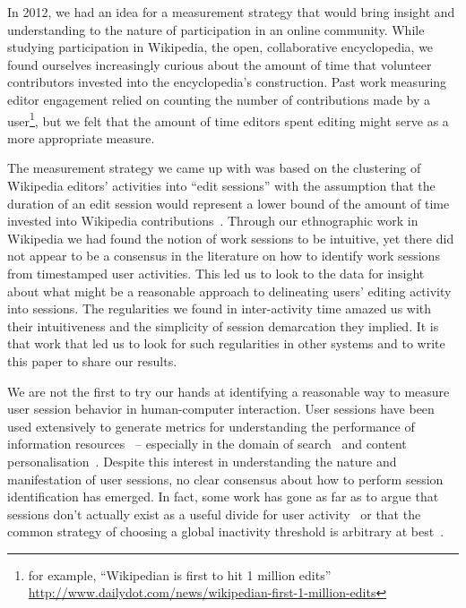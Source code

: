 In 2012, we had an idea for a measurement strategy that would bring insight and understanding to the nature of participation in an online community.  While studying participation in Wikipedia, the open, collaborative encyclopedia, we found ourselves increasingly curious about the amount of time that volunteer contributors invested into the encyclopedia's construction.  Past work measuring editor engagement relied on counting the number of contributions made by a user\footnote{for example, ``Wikipedian is first to hit 1 million edits'' \url{http://www.dailydot.com/news/wikipedian-first-1-million-edits}}, but we felt that the amount of time editors spent editing might serve as a more appropriate measure.

The measurement strategy we came up with was based on the clustering of Wikipedia editors' activities into ``edit sessions'' with the assumption that the duration of an edit session would represent a lower bound of the amount of time invested into Wikipedia contributions~\cite{geiger2013using}.  Through our ethnographic work in Wikipedia we had found the notion of work sessions to be intuitive, yet there did not appear to be a consensus in the literature on how to identify work sessions from timestamped user activities.  This led us to look to the data for insight about what might be a reasonable approach to delineating users' editing activity into sessions.  The regularities we found in inter-activity time amazed us with their intuitiveness and the simplicity of session demarcation they implied. It is that work that led us to look for such regularities in other systems and to write this paper to share our results.

We are not the first to try our hands at identifying a reasonable way to measure user session behavior in human-computer interaction.  User sessions have been used extensively to generate metrics for understanding the performance of information resources~\cite{govseva2006empirical} -- especially in the domain of search~\cite{donato2010you,eickhoff2014lessons} and content personalisation~\cite{gomory1999analysis,spiliopoulou2003framework}. Despite this interest in understanding the nature and manifestation of user sessions, no clear consensus about how to perform session identification has emerged.  In fact, some work has gone as far as to argue that sessions don't actually exist as a useful divide for user activity~\cite{jones2008beyond} or that the common strategy of choosing a global inactivity threshold is arbitrary at best~\cite{montgomery2001identifying}.

